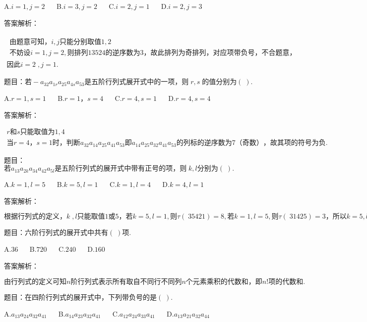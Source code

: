 A.$i=1,j=2$ $\quad$ B.$i=3,j=2$ $\quad$ C.$i=2,j=1$ $\quad$ D.$i=2,j=3$

答案解析：

$\begin{array}{l}\begin{array}{l}\mathrm{由题意可知}，i,j\mathrm{只能分别取值}1,2\\\mathrm{不妨设}i=1,j=2,\mathrm{则排列}13524\mathrm{的逆序数为}3，\mathrm{故此排列为奇排列}，\mathrm{对应项带负号}，\mathrm{不合题意}，\end{array}\\\mathrm{因此}i=2\;,j=1.\end{array}$



题目：$若-a_{32}a_{1r}a_{25}a_{4s}a_{53}\mathrm{是五阶行列式展开式中的一项}，则\;r,s\;\mathrm{的值分别为}(\;).$

A.$r=1,s=1$ $\quad$ B.$r=1，s=4$ $\quad$ C.$r=4,s=1$ $\quad$ D.$r=4,s=4$

答案解析：

$\begin{array}{l}r和s\mathrm{只能取值为}1,4\\当r=4，s=1时，\mathrm{判断}a_{32}a_{14}a_{25}a_{41}a_{53}即a_{14}a_{25}a_{32}a_{41}a_{53}\mathrm{的列标的逆序数为}7（\mathrm{奇数}），\mathrm{故其项的符号为负}.\end{array}$



题目：$若a_{13}a_{2k}a_{34}a_{42}a_{5l}\mathrm{是五阶行列式的展开式中带有正号的项}，则\;k,l\mathrm{分别为}(\;).$

A.$k=1,l=5$ $\quad$ B.$k=5,l=1$ $\quad$ C.$k=1,l=4$ $\quad$ D.$k=4,l=1$

答案解析：

$\mathrm{根据行列式的定义}，k\;,l\mathrm{只能取值}1或5，若k=5,l=1,则\tau(\;35421)=8,若k=1,l=5,则\tau(\;31425)=3，\mathrm{所以}k=5,l=1.$



题目：$\mathrm{六阶行列式的展开式中共有}(\;)项.$

A.$36$ $\quad$ B.$720$ $\quad$ C.$240$ $\quad$ D.$160$

答案解析：

$\mathrm{由行列式的定义可知}n\mathrm{阶行列式表示所有取自不同行不同列}n\mathrm{个元素乘积的代数和}，即n!\mathrm{项的代数和}.$



题目：$\mathrm{在四阶行列式的展开式中}，\mathrm{下列带负号的是}(\;).$

A.$a_{13}a_{24}a_{32}a_{41}$ $\quad$ B.$a_{14}a_{23}a_{32}a_{41}$ $\quad$ C.$a_{12}a_{24}a_{33}a_{41}$ $\quad$ D.$a_{13}a_{21}a_{32}a_{44}$


